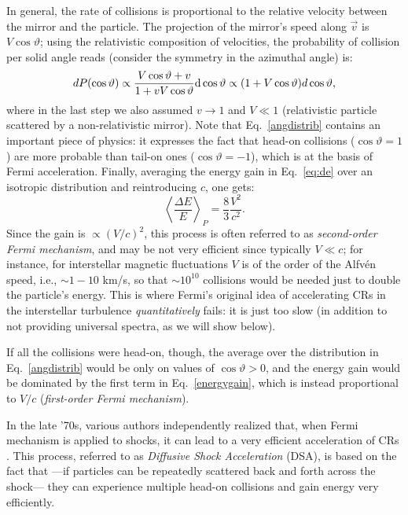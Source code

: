 \documentclass[varenna]{cimento}
\newcommand{\alf}{Alfv\'en }
\begin{document}
In general, the rate of collisions is proportional to the relative velocity between the mirror and the particle.
The projection of the mirror's speed along $\vec{v}$ is $V\cos\vartheta$; 
using the relativistic composition of velocities, the probability of collision per solid angle reads (consider the symmetry in the azimuthal angle) is:
\begin{equation}\label{angdistrib}
    dP(\cos\vartheta)\propto \frac{V\cos\vartheta+v}{1+vV\cos\vartheta} {\rm d}\cos\vartheta\propto (1+V\cos\vartheta)d\cos\vartheta,
\end{equation}
where in the last step we also assumed $v\to 1$ and $V\ll 1$ (relativistic particle scattered by a non-relativistic mirror).
Note that Eq.~\ref{angdistrib} contains an important piece of physics: it expresses the fact that head-on collisions ($\cos\vartheta=1$)  are more probable than tail-on ones ($\cos\vartheta=-1$), which is at the basis of Fermi acceleration.
Finally, averaging the energy gain in Eq.~\ref{eq:de} over an isotropic distribution and reintroducing $c$, one gets:
\begin{equation}\label{IIOFM}
\left\langle  \frac{\Delta E}{E} \right\rangle_P=\frac{8}{3}\frac{V^2}{c^2}.
\end{equation}
Since the gain is  $\propto (V/c)^2$, this process is often referred to as \emph{second-order Fermi mechanism}, and  may be not very efficient since typically $V\ll c$; for instance, for interstellar magnetic fluctuations $V$ is of the order of the \alf speed, i.e., $\sim 1-10$ km/s, so that $\sim 10^{10}$ collisions would be needed just to double the particle's energy.
This is where Fermi's original idea of accelerating CRs in the interstellar turbulence  \emph{quantitatively} fails: it is just too slow (in addition to not providing universal spectra, as we will show below).

If all the collisions were head-on, though, the average over the distribution in Eq.~\ref{angdistrib} would be only on values of $\cos\vartheta>0$, and the energy gain would be dominated by the first term in Eq.~\ref{energygain}, which is instead proportional to $V/c$ (\emph{first-order Fermi mechanism}). 

In the late '70s, various authors independently realized that, when Fermi mechanism is applied to shocks, it can lead to a very efficient acceleration of CRs \cite{krymskii77,axford+78, blandford+78, bell78a, bell78b}.
This process, referred to as \emph{Diffusive Shock Acceleration} (DSA), is based on the fact that ---if particles can be repeatedly scattered back and forth across the shock--- they can experience multiple head-on collisions and gain energy very efficiently.
\end{document}
